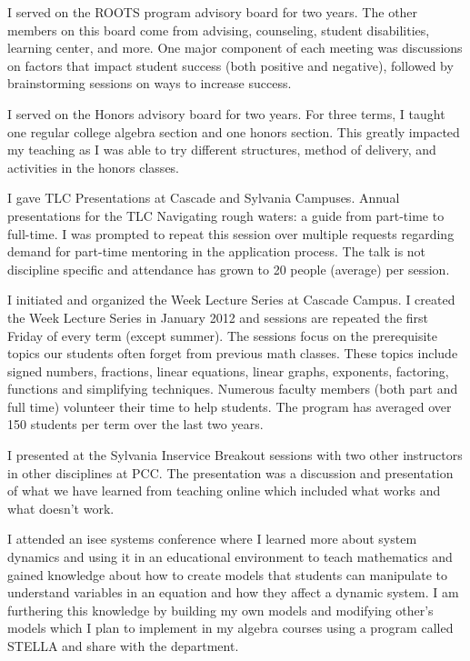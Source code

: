 \begin{description}[style=nextline]
	\item[Ronda Lively (Faculty Chair, Sylvania Campus)]
	I served on the ROOTS program advisory board for two years.  The other members
	on this board come from advising, counseling, student disabilities, learning
	center, and more. One major component of each meeting was discussions on
	factors that impact student success (both positive and negative), followed by
	brainstorming sessions on ways to increase success.

	I served on the Honors advisory board for two years.  For three terms, I taught
	one regular college algebra section and one honors section. This greatly
	impacted my teaching as I was able to try different structures, method of
	delivery, and activities in the honors classes.

	\item[Tammy Louie (Full-time Instructor, Cascade Campus)]
	I gave TLC Presentations at Cascade and Sylvania Campuses.  Annual
	presentations for the TLC Navigating rough waters: a guide from part-time
	to full-time. I was prompted to repeat this session over multiple requests
	regarding demand for part-time mentoring in the application process. The talk
	is not discipline specific and attendance has grown to 20 people (average) per
	session.

	I initiated and organized the  Week Lecture Series at Cascade
	Campus.  I created the  Week Lecture Series in January 2012 and sessions are
	repeated the first Friday of every term (except summer). The sessions focus on
	the prerequisite topics our students often forget from previous math classes.
	These topics include signed numbers, fractions, linear equations, linear
	graphs, exponents, factoring, functions and simplifying techniques. Numerous
	faculty members (both part and full time) volunteer their time to help
	students. The program has averaged over 150 students per term over the last two
	years.

\item[Rita Luetkenhaus (Temporary Job-share Instructor, Sylvania Campus)]
	I presented at the Sylvania Inservice Breakout sessions with two other
	instructors in other disciplines at PCC.  The presentation was a discussion and
	presentation of what we have learned from teaching online which included what
	works and what doesn't work.

	I attended an isee systems conference where I learned more about system
	dynamics and using it in an educational environment to teach mathematics and
	gained knowledge about how to create models that students can manipulate to
	understand variables in an equation and how they affect a dynamic system.  I am
	furthering this knowledge by building my own models and modifying other's
	models which I plan to implement in my algebra courses using a program called
	STELLA and share with the department.


\end{description}
